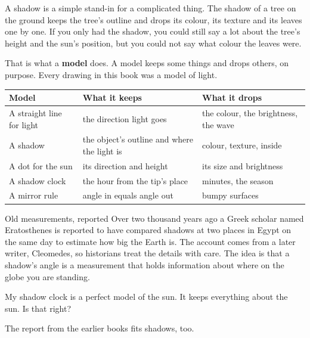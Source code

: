 \label{ch6}

A shadow is a simple stand-in for a complicated thing. The shadow of a tree on the ground keeps the tree's outline and drops its colour, its texture and its leaves one by one. If you only had the shadow, you could still say a lot about the tree's height and the sun's position, but you could not say what colour the leaves were.

That is what a \textbf{model} does. A model keeps some things and drops others, on purpose. Every drawing in this book was a model of light.

\begin{center}
\sffamily\small\renewcommand{\arraystretch}{1.5}
\begin{tabular}{@{}p{3.6cm}p{3.7cm}p{3.7cm}@{}}
\toprule
\textbf{Model} & \textbf{What it keeps} & \textbf{What it drops}\\
\midrule
A straight line for light & the direction light goes & the colour, the brightness, the wave\\
A shadow & the object's outline and where the light is & colour, texture, inside\\
A dot for the sun & its direction and height & its size and brightness\\
A shadow clock & the hour from the tip's place & minutes, the season\\
A mirror rule & angle in equals angle out & bumpy surfaces\\
\bottomrule
\end{tabular}
\end{center}

\begin{worked}{Old measurements, reported}
Over two thousand years ago a Greek scholar named Eratosthenes is reported to have compared shadows at two places in Egypt on the same day to estimate how big the Earth is. The account comes from a later writer, Cleomedes, so historians treat the details with care. The idea is that a shadow's angle is a measurement that holds information about where on the globe you are standing.
\end{worked}

\begin{multix}[hmm]\multixbot[hmm]\tcblower
My shadow clock is a perfect model of the sun. It keeps everything about the sun. Is that right?
\end{multix}

The report from the earlier books fits shadows, too.

